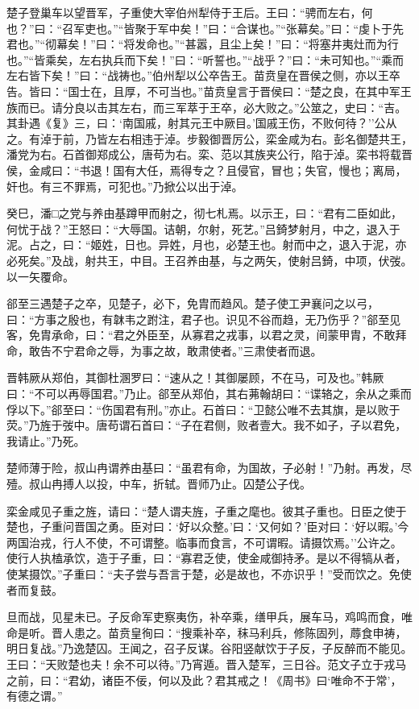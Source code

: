 \documentclass[]{article}
\begin{document}
楚子登巢车以望晋军，子重使大宰伯州犁侍于王后。王曰：``骋而左右，何也？''曰：``召军吏也。''``皆聚于军中矣！''曰：``合谋也。''``张幕矣。''曰：``虔卜于先君也。''``彻幕矣！''曰：``将发命也。''``甚嚣，且尘上矣！''曰：``将塞井夷灶而为行也。''``皆乘矣，左右执兵而下矣！''曰：``听誓也。''``战乎？''曰：``未可知也。''``乘而左右皆下矣！''曰：``战祷也。''伯州犁以公卒告王。苗贲皇在晋侯之侧，亦以王卒告。皆曰：``国士在，且厚，不可当也。''苗贲皇言于晋侯曰：``楚之良，在其中军王族而已。请分良以击其左右，而三军萃于王卒，必大败之。''公筮之，史曰：``吉。其卦遇《复》三，曰：`南国戚，射其元王中厥目。'国戚王伤，不败何待？''公从之。有淖于前，乃皆左右相违于淖。步毅御晋厉公，栾金咸为右。彭名御楚共王，潘党为右。石首御郑成公，唐苟为右。栾、范以其族夹公行，陷于淖。栾书将载晋侯，金咸曰：``书退！国有大任，焉得专之？且侵官，冒也；失官，慢也；离局，奸也。有三不罪焉，可犯也。''乃掀公以出于淖。

癸巳，潘□之党与养由基蹲甲而射之，彻七札焉。以示王，曰：``君有二臣如此，何忧于战？''王怒曰：``大辱国。诘朝，尔射，死艺。''吕錡梦射月，中之，退入于泥。占之，曰：``姬姓，日也。异姓，月也，必楚王也。射而中之，退入于泥，亦必死矣。''及战，射共王，中目。王召养由基，与之两矢，使射吕錡，中项，伏弢。以一矢覆命。

郤至三遇楚子之卒，见楚子，必下，免胄而趋风。楚子使工尹襄问之以弓，曰：``方事之殷也，有韎韦之跗注，君子也。识见不谷而趋，无乃伤乎？''郤至见客，免胄承命，曰：``君之外臣至，从寡君之戎事，以君之灵，间蒙甲胄，不敢拜命，敢告不宁君命之辱，为事之故，敢肃使者。''三肃使者而退。

晋韩厥从郑伯，其御杜溷罗曰：``速从之！其御屡顾，不在马，可及也。''韩厥曰：``不可以再辱国君。''乃止。郤至从郑伯，其右茀翰胡曰：``谍辂之，余从之乘而俘以下。''郤至曰：``伤国君有刑。''亦止。石首曰：``卫懿公唯不去其旗，是以败于荧。''乃旌于弢中。唐苟谓石首曰：``子在君侧，败者壹大。我不如子，子以君免，我请止。''乃死。

楚师薄于险，叔山冉谓养由基曰：``虽君有命，为国故，子必射！''乃射。再发，尽殪。叔山冉搏人以投，中车，折轼。晋师乃止。囚楚公子伐。

栾金咸见子重之旌，请曰：``楚人谓夫旌，子重之麾也。彼其子重也。日臣之使于楚也，子重问晋国之勇。臣对曰：`好以众整。'曰：`又何如？'臣对曰：`好以暇。'今两国治戎，行人不使，不可谓整。临事而食言，不可谓暇。请摄饮焉。''公许之。使行人执榼承饮，造于子重，曰：``寡君乏使，使金咸御持矛。是以不得犒从者，使某摄饮。''子重曰：``夫子尝与吾言于楚，必是故也，不亦识乎！''受而饮之。免使者而复鼓。

旦而战，见星未已。子反命军吏察夷伤，补卒乘，缮甲兵，展车马，鸡鸣而食，唯命是听。晋人患之。苗贲皇徇曰：``搜乘补卒，秣马利兵，修陈固列，蓐食申祷，明日复战。''乃逸楚囚。王闻之，召子反谋。谷阳竖献饮于子反，子反醉而不能见。王曰：``天败楚也夫！余不可以待。''乃宵遁。晋入楚军，三日谷。范文子立于戎马之前，曰：``君幼，诸臣不佞，何以及此？君其戒之！《周书》曰`唯命不于常'，有德之谓。''
\end{document}
